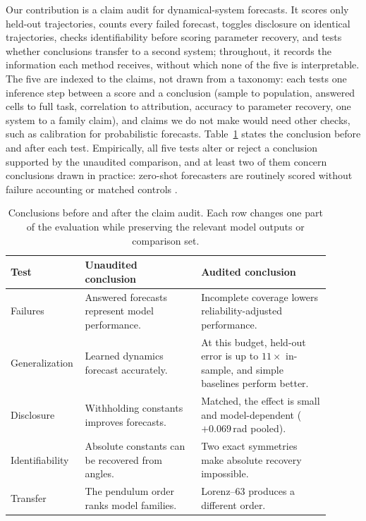\documentclass{article}
\begin{document}
Our contribution is a claim audit for dynamical-system forecasts. It scores only held-out
trajectories, counts every failed forecast, toggles disclosure on identical trajectories,
checks identifiability before scoring parameter recovery, and tests whether conclusions transfer
to a second system; throughout, it records the information each method receives, without which
none of the five is interpretable. The five are indexed to the claims, not drawn from a
taxonomy: each tests one inference step between a score and a conclusion (sample to population,
answered cells to full task, correlation to attribution, accuracy to parameter recovery, one
system to a family claim), and claims we do not make would need other checks, such as
calibration for probabilistic forecasts.
Table~\ref{tab:audit-summary} states the conclusion before and after each test. Empirically,
all five tests alter or reject a conclusion supported by the unaudited comparison, and at least
two of them concern conclusions drawn in practice: zero-shot forecasters are routinely scored
without failure accounting or matched controls
\citep{gruver2023llmtime,zhang2025zeroshotchaos}.

\begin{table}[tbp]
\centering\footnotesize\renewcommand{\arraystretch}{0.78}
\caption{Conclusions before and after the claim audit. Each row changes one part of the
evaluation while preserving the relevant model outputs or comparison set.}
\label{tab:audit-summary}
\begin{tabular}{p{0.16\linewidth}p{0.35\linewidth}p{0.39\linewidth}}
\toprule
Test & Unaudited conclusion & Audited conclusion \\
\midrule
Failures &
Answered forecasts represent model performance. &
Incomplete coverage lowers reliability-adjusted performance. \\
Generalization &
Learned dynamics forecast accurately. &
At this budget, held-out error is up to $11\times$ in-sample, and simple baselines perform better. \\
Disclosure &
Withholding constants improves forecasts. &
Matched, the effect is small and model-dependent ($+0.069$\,rad pooled). \\
Identifiability &
Absolute constants can be recovered from angles. &
Two exact symmetries make absolute recovery impossible. \\
Transfer &
The pendulum order ranks model families. &
Lorenz--63 produces a different order. \\
\bottomrule
\end{tabular}
\end{table}
\end{document}
